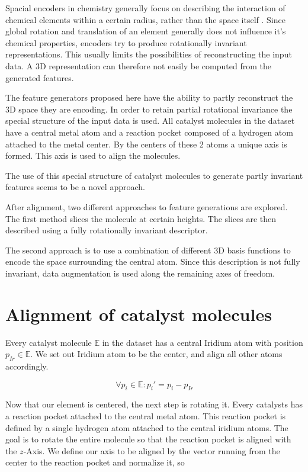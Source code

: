 Spacial encoders in chemistry generally focus on describing the interaction of chemical elements within a certain radius, rather 
than the space itself \cite{Bart_k_2013}.
Since global rotation and translation of an element generally does not influence it's chemical properties,
encoders try to produce rotationally invariant representations.
This usually limits the possibilities of reconstructing the input data.
A 3D representation can therefore not easily be computed from the generated features.

The feature generators proposed here have the ability to partly reconstruct the 3D space they are encoding.
In order to retain partial rotational invariance the special structure of the input data is used.
All catalyst molecules in the dataset have a central metal atom and a reaction pocket composed of a hydrogen atom attached to the metal center.
By the centers of these 2 atoms a unique axis is formed.
This axis is used to align the molecules.

The use of this special structure of catalyst molecules to generate partly invariant features seems to be a novel approach.

After alignment, two different approaches to feature generations are explored.
The first method slices the molecule at certain heights.
The slices are then described using a fully rotationally invariant descriptor.

The second approach is to use a combination of different 3D basis functions to encode the space surrounding the central atom.
Since this description is not fully invariant, data augmentation is used along the remaining axes of freedom.

\section{Alignment of catalyst molecules}

Every catalyst molecule $\mathbb{E}$ in the dataset has a central Iridium atom with position $p_{Ir} \in \mathbb{E}$.
We set out Iridium atom to be the center, and align all other atoms accordingly.

$$ \forall p_i \in \mathbb{E}: p_i' = p_i - p_{Ir}$$

Now that our element is centered, the next step is rotating it.
Every catalysts has a reaction pocket attached to the central metal atom.
This reaction pocket is defined by a single hydrogen atom attached to the central iridium atoms.
The goal is to rotate the entire molecule so that the reaction pocket is aligned with the $z$-Axis.
We define our axis to be aligned by the vector running from the center to the reaction pocket and normalize it, so


